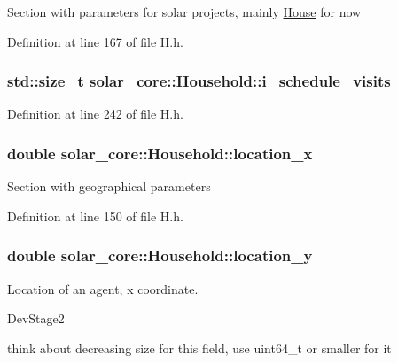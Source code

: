 Section with parameters for solar projects, mainly \hyperlink{classsolar__core_1_1_house}{House} for now 

Definition at line 167 of file H.\+h.

\hypertarget{classsolar__core_1_1_household_a077c668f06c009a43c535f1ad92cf92e}{}
\subsubsection[{i\+\_\+schedule\+\_\+visits}]{\setlength{\rightskip}{0pt plus 5cm}std\+::size\+\_\+t solar\+\_\+core\+::\+Household\+::i\+\_\+schedule\+\_\+visits\hspace{0.3cm}{\ttfamily [protected]}}\label{classsolar__core_1_1_household_a077c668f06c009a43c535f1ad92cf92e}


Definition at line 242 of file H.\+h.

\hypertarget{classsolar__core_1_1_household_a6596375631a366fdd24270f75548841f}{}
\subsubsection[{location\+\_\+x}]{\setlength{\rightskip}{0pt plus 5cm}double solar\+\_\+core\+::\+Household\+::location\+\_\+x}\label{classsolar__core_1_1_household_a6596375631a366fdd24270f75548841f}
Section with geographical parameters 

Definition at line 150 of file H.\+h.

\hypertarget{classsolar__core_1_1_household_a1ba6b7af82982096e05d99a70a2647eb}{}
\subsubsection[{location\+\_\+y}]{\setlength{\rightskip}{0pt plus 5cm}double solar\+\_\+core\+::\+Household\+::location\+\_\+y}\label{classsolar__core_1_1_household_a1ba6b7af82982096e05d99a70a2647eb}
Location of an agent, x coordinate.\begin{DoxyRefDesc}{Dev\+Stage2}
\item[\hyperlink{_dev_stage2__DevStage2000006}{Dev\+Stage2}]think about decreasing size for this field, use uint64\+\_\+t or smaller for it \end{DoxyRefDesc}


